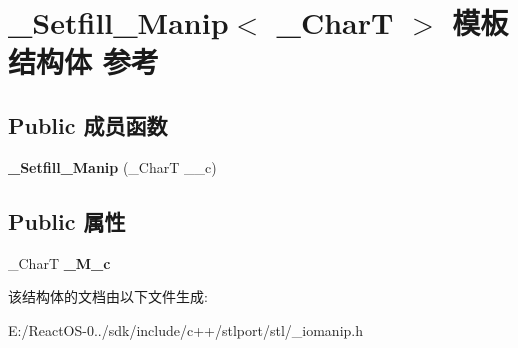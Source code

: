 \hypertarget{struct___setfill___manip}{}\section{\+\_\+\+Setfill\+\_\+\+Manip$<$ \+\_\+\+CharT $>$ 模板结构体 参考}
\label{struct___setfill___manip}
\subsection*{Public 成员函数}
\begin{DoxyCompactItemize}
\item 
\mbox{\label{struct___setfill___manip_a7e49d6b6c062c1e4225d5d1fa65fd511}} 
{\bfseries \+\_\+\+Setfill\+\_\+\+Manip} (\+\_\+\+CharT \+\_\+\+\_\+c)
\end{DoxyCompactItemize}
\subsection*{Public 属性}
\begin{DoxyCompactItemize}
\item 
\mbox{\label{struct___setfill___manip_acfd8191b7594be3699b480bdfbd9cbe2}} 
\+\_\+\+CharT {\bfseries \+\_\+\+M\+\_\+c}
\end{DoxyCompactItemize}


该结构体的文档由以下文件生成\+:\begin{DoxyCompactItemize}
\item 
E\+:/\+React\+O\+S-\/0../sdk/include/c++/stlport/stl/\+\_\+iomanip.\+h\end{DoxyCompactItemize}

